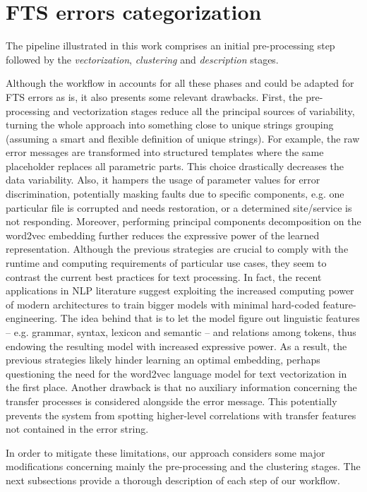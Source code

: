 \section{FTS errors categorization} \label{sec:pipeline}

The pipeline illustrated in this work comprises an initial pre-processing step followed by the \textit{vectorization}, \textit{clustering} and \textit{description} stages.

Although the workflow in
 accounts for all these phases and could be adapted for FTS errors as is, it also presents some relevant drawbacks.
First, the pre-processing and vectorization stages reduce all the principal sources of variability, turning the whole approach into something close to unique strings grouping (assuming a smart and flexible definition of unique strings). 
For example,  the raw error messages are transformed into structured templates where the same placeholder replaces all parametric parts.
This choice drastically decreases the data variability. Also, it hampers the usage of parameter values for error discrimination, potentially masking faults due to specific components, e.g. one particular file is corrupted and needs restoration, or a determined site/service is not responding.
Moreover, performing principal components decomposition on the word2vec embedding further reduces the expressive power of the learned representation.
Although the previous strategies are crucial to comply with the runtime and computing requirements of particular use cases, they seem to contrast the current best practices for text processing. 
In fact,  the recent applications in NLP literature suggest exploiting the increased computing power of modern architectures to train bigger models with minimal hard-coded feature-engineering. 
The idea behind that is to let the model figure out linguistic features -- e.g. grammar, syntax, lexicon and semantic -- and relations among tokens, thus endowing the resulting model with increased expressive power.
As a result, the previous strategies likely hinder learning an optimal embedding, perhaps questioning the need for the word2vec language model for text vectorization in the first place.
Another drawback is that no auxiliary information concerning the transfer processes is considered alongside the error message. This potentially prevents the system from spotting higher-level correlations with transfer features not contained in the error string.

In order to mitigate these limitations, our approach considers some major modifications concerning mainly the pre-processing and the clustering stages.
The next subsections provide a thorough description of each step of our workflow.%






